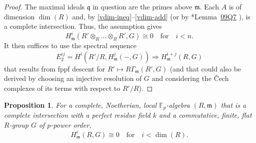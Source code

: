 \documentclass[11pt, reqno]{amsart}
\newcommand{\bF}{\mathbb{F}}
\newcommand{\fm}{\mathfrak{m}}
\newcommand{\fq}{\mathfrak{q}}
\newcommand{\ra}{\rightarrow}
\newcommand{\Ra}{\Rightarrow}
\newcommand{\tensor}{\otimes} 			%
\newcommand{\wt}{\widetilde}
\newcommand{\beg}{\begin{eg}}
\newcommand{\eeg}{\end{eg}}
\newcommand{\lab}{\label}
\providecommand{\qxq}[1]{\quad\text{#1}\quad}
\newcommand{\bpf}{\begin{proof}}
\newcommand{\epf}{\end{proof}}
\newcommand{\bprop}{\begin{prop}}
\newcommand{\eprop}{\end{prop}}
\numberwithin{equation}{numberingbase}
\theoremstyle{thms}
\newtheorem{prop}[numberingbase]{Proposition}
\theoremstyle{claims}
\theoremstyle{defs}
\newtheorem{eg}[numberingbase]{Example}
\theoremstyle{thms}
\theoremstyle{defs}
\theoremstyle{subsection-tweak}
\theoremstyle{subsection-tweak}
\begin{document}
\bpf
The maximal ideals $\fq$ in question are the primes above $\fm$. Each $A$ is of dimension $\dim(R)$ and, by \eqref{vdim-ineq}--\eqref{vdim-add} (or by \cite{SP}*{Lemma~\href{https://stacks.math.columbia.edu/tag/09Q7}{09Q7}%
}), is a complete intersection. Thus, the assumption gives 
\[
H^i_\fm(R' \tensor_R \dotsc \tensor_R R', G) \cong 0 \qxq{for} i < n.
\]
It then suffices to use the spectral sequence 
\[
E_2^{ij} = H^i(R'/R, H^j_\fm(-, G)) \Ra H^{i + j}_\fm(R, G)
\]
that results from fppf descent for $R'\mapsto R\Gamma_\fm(R',G)$ (and that could also be derived by choosing an injective resolution of $G$ and considering the \v{C}ech complexes of its terms with respect to $R'/R$).
\epf





\bprop \label{thm:main-pos-char}
For a complete, Noetherian, local $\bF_p$-algebra $(R, \fm)$ that is a complete intersection with a perfect residue field $k$ and a commutative, finite, flat $R$-group $G$ of $p$-power order,
\[
H^i_\fm(R, G) \cong 0 \qxq{for} i < \dim(R).
\]
\eprop
\end{document}
